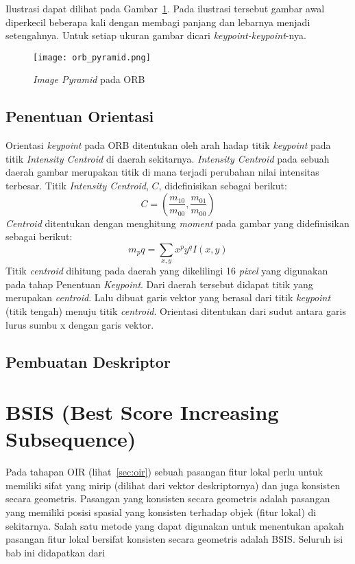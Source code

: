 Ilustrasi dapat dilihat pada Gambar~\ref{fig:orb_pyramid}. Pada ilustrasi tersebut gambar awal diperkecil beberapa kali dengan membagi panjang dan lebarnya menjadi setengahnya. Untuk setiap ukuran gambar dicari \textit{keypoint-keypoint}-nya.

\begin{figure}[H]
	\centering
	\texttt{[image: orb\_pyramid.png]}
	\caption{\textit{Image Pyramid} pada ORB}
	\label{fig:orb_pyramid}	
\end{figure}

\subsection{Penentuan Orientasi}
Orientasi \textit{keypoint} pada ORB ditentukan oleh arah hadap titik \textit{keypoint} pada titik \textit{Intensity Centroid} di daerah sekitarnya. \textit{Intensity Centroid} pada sebuah daerah gambar merupakan titik di mana terjadi perubahan nilai intensitas terbesar. Titik \textit{Intensity Centroid}, $C$, didefinisikan sebagai berikut:
\begin{equation}
	C=(\frac{m_{10}}{m_{00}}, \frac{m_{01}}{m_{00}})
\end{equation}
\textit{Centroid} ditentukan dengan menghitung \textit{moment} pada gambar yang didefinisikan sebagai berikut:
\begin{equation}
	m_pq=\sum_{x,y}x^py^qI(x,y)
\end{equation}
Titik \textit{centroid} dihitung pada daerah yang dikelilingi 16 \textit{pixel} yang digunakan pada tahap Penentuan \textit{Keypoint}. Dari daerah tersebut didapat titik yang merupakan \textit{centroid}. Lalu dibuat garis vektor yang berasal dari titik \textit{keypoint} (titik tengah) menuju titik \textit{centroid}. Orientasi ditentukan dari sudut antara garis lurus sumbu x dengan garis vektor.

\subsection{Pembuatan Deskriptor}

\section{BSIS (Best Score Increasing Subsequence)}
\label{sec:bsis}
Pada tahapan OIR (lihat~\ref{sec:oir}) sebuah pasangan fitur lokal perlu untuk memiliki sifat yang mirip (dilihat dari vektor deskriptornya) dan juga konsisten secara geometris. Pasangan yang konsisten secara geometris adalah pasangan yang memiliki posisi spasial yang konsisten terhadap objek (fitur lokal) di sekitarnya. Salah satu metode yang dapat digunakan untuk menentukan apakah pasangan fitur lokal bersifat konsisten secara geometris adalah BSIS. Seluruh isi bab ini didapatkan dari~\cite{kusuma2019bsis}

